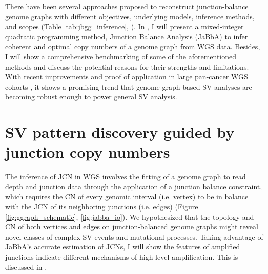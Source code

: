 \documentclass[phd,tocprelim]{cornell}
\begin{document}
There have been several approaches proposed to reconstruct junction-balance genome graphs with different objectives, underlying models, inference methods, and scopes (Table \ref{tab:jbgg_inference}, \cite{Oesper2012-vw,McPherson2017-ry,Li2016-qa,Dzamba2017-wo,Deshpande2019-gs,Li2020-ds,Lee2021-rl,Aganezov2019-yh}). In , I will present a mixed-integer quadratic programming method, Junction Balance Analysis (JaBbA) to infer coherent and optimal copy numbers of a genome graph from WGS data. Besides, I will show a comprehensive benchmarking of some of the aforementioned methods and discuss the potential reasons for their strengths and limitations. With recent improvements and proof of application in large pan-cancer WGS cohorts \cite{Hadi2020-um}, it shows a promising trend that genome graph-based SV analyses are becoming robust enough to power general SV analysis.

\section{SV pattern discovery guided by junction copy numbers}

The inference of JCN in WGS involves the fitting of a genome graph to read depth and junction data through the application of a junction balance constraint, which requires the CN of every genomic interval (i.e. vertex) to be in balance with the JCN of its neighboring junctions (i.e. edges) (Figure \ref{fig:ggraph_schematic}, \ref{fig:jabba_io})\cite{Medvedev:2010bm, Greenman:2012eg, Oesper2012-vw, Li2016-qa, Dzamba2017-wo, McPherson2017-ry}. We hypothesized that the topology and CN of both vertices and edges on junction-balanced genome graphs might reveal novel classes of complex SV events and mutational processes. Taking advantage of JaBbA's accurate estimation of JCNs, I will show the features of amplified junctions indicate different mechanisms of high level amplification. This is discussed in .
\end{document}
